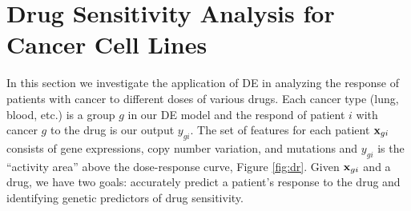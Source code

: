 \section{Drug Sensitivity Analysis for Cancer Cell Lines}
\label{realexp}
In this section we investigate the application of DE in analyzing the response of patients with cancer to different doses of various drugs. 
Each cancer type (lung, blood, etc.) is a group $g$ in our DE model and the respond of patient $i$ with cancer $g$ to the drug is our output $y_{gi}$. 
The set of features for each patient $\mathbf{x}_{gi}$ consists of gene expressions, copy number variation, and mutations and $y_{gi}$ is the ``activity area'' above the dose-response curve, Figure \ref{fig:dr}.
Given $\mathbf{x}_{gi}$ and a drug, we have two goals: accurately predict a patient's response to the drug and identifying genetic predictors of drug sensitivity. 
%

